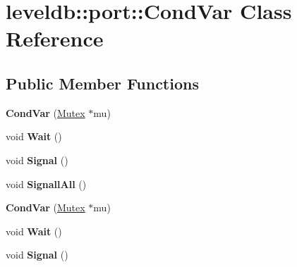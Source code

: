 \hypertarget{classleveldb_1_1port_1_1_cond_var}{}\section{leveldb\+:\+:port\+:\+:Cond\+Var Class Reference}
\label{classleveldb_1_1port_1_1_cond_var}
\subsection*{Public Member Functions}
\begin{DoxyCompactItemize}
\item 
\mbox{\label{classleveldb_1_1port_1_1_cond_var_abb23c74c7b58298a20d4cfd6a0c5839a}} 
{\bfseries Cond\+Var} (\mbox{\hyperlink{classleveldb_1_1port_1_1_mutex}{Mutex}} $\ast$mu)
\item 
\mbox{\label{classleveldb_1_1port_1_1_cond_var_a9e9855595a3f3a3ccf47949696065597}} 
void {\bfseries Wait} ()
\item 
\mbox{\label{classleveldb_1_1port_1_1_cond_var_ac36a2038b058b24886741c99e4a7d7d4}} 
void {\bfseries Signal} ()
\item 
\mbox{\label{classleveldb_1_1port_1_1_cond_var_a516114902b0ac99e541d74f182faa7b4}} 
void {\bfseries Signall\+All} ()
\item 
\mbox{\label{classleveldb_1_1port_1_1_cond_var_abb23c74c7b58298a20d4cfd6a0c5839a}} 
{\bfseries Cond\+Var} (\mbox{\hyperlink{classleveldb_1_1port_1_1_mutex}{Mutex}} $\ast$mu)
\item 
\mbox{\label{classleveldb_1_1port_1_1_cond_var_a9e9855595a3f3a3ccf47949696065597}} 
void {\bfseries Wait} ()
\item 
\mbox{\label{classleveldb_1_1port_1_1_cond_var_ac36a2038b058b24886741c99e4a7d7d4}} 
void {\bfseries Signal} ()
\item 
\mbox{\label{classleveldb_1_1port_1_1_cond_var_ad7725662f3c1bc542100c41081d1428a}} 

\end{DoxyCompactItemize}
